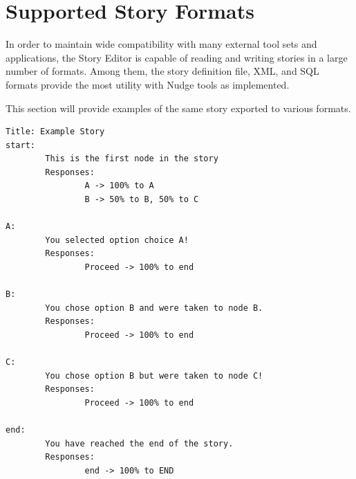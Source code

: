 \documentclass[12pt,letterpaper]{article}
\begin{document}
\section{Supported Story Formats}
In order to maintain wide compatibility with many external tool sets and applications, the Story Editor is capable of reading and writing stories in a large number of formats.
Among them, the story definition file, XML, and SQL formats provide the most utility with Nudge tools as implemented.

This section will provide examples of the same story exported to various formats.

\lstset{numbers=left, frame=shadowbox}
\begin{lstlisting}[breaklines=true, caption=Example story in story format.]
Title: Example Story
start:
        This is the first node in the story
        Responses:
                A -> 100% to A
                B -> 50% to B, 50% to C

A:
        You selected option choice A!
        Responses:
                Proceed -> 100% to end

B:
        You chose option B and were taken to node B.
        Responses:
                Proceed -> 100% to end

C:
        You chose option B but were taken to node C!
        Responses:
                Proceed -> 100% to end

end:
        You have reached the end of the story.
        Responses:
                end -> 100% to END
\end{lstlisting}
\end{document}
